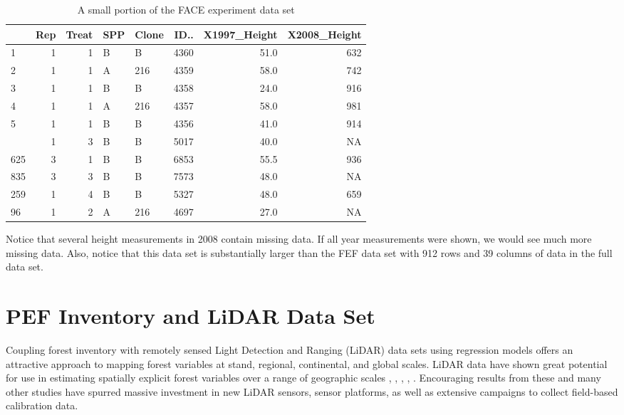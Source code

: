 \documentclass[]{krantz}
\begin{document}
\begin{table}[t]

\caption{\label{tab:face}A small portion of the FACE experiment data set}
\centering
\begin{tabular}{lrrllrrr}
\toprule
  & Rep & Treat & SPP & Clone & ID.. & X1997\_Height & X2008\_Height\\
\midrule
1 & 1 & 1 & B & B & 4360 & 51.0 & 632\\
2 & 1 & 1 & A & 216 & 4359 & 58.0 & 742\\
3 & 1 & 1 & B & B & 4358 & 24.0 & 916\\
4 & 1 & 1 & A & 216 & 4357 & 58.0 & 981\\
5 & 1 & 1 & B & B & 4356 & 41.0 & 914\\
\addlinespace
183 & 1 & 3 & B & B & 5017 & 40.0 & NA\\
625 & 3 & 1 & B & B & 6853 & 55.5 & 936\\
835 & 3 & 3 & B & B & 7573 & 48.0 & NA\\
259 & 1 & 4 & B & B & 5327 & 48.0 & 659\\
96 & 1 & 2 & A & 216 & 4697 & 27.0 & NA\\
\bottomrule
\end{tabular}
\end{table}

Notice that several height measurements in 2008 contain missing data. If all year measurements were shown, we would see much more missing data. Also, notice that this data set is substantially larger than the FEF data set with 912 rows and 39 columns of data in the full data set.

\hypertarget{pef}{%
\section{PEF Inventory and LiDAR Data Set}\label{pef}}

Coupling forest inventory with remotely sensed Light Detection and Ranging (LiDAR) data sets using regression models offers an attractive approach to mapping forest variables at stand, regional, continental, and global scales. LiDAR data have shown great potential for use in estimating spatially explicit forest variables over a range of geographic scales \citep{asner2009}, \citep{babcock2013}, \citep{finley2011}, \citep{naesset2011}, \citep{neigh2013}. Encouraging results from these and many other studies have spurred massive investment in new LiDAR sensors, sensor platforms, as well as extensive campaigns to collect field-based calibration data.
\end{document}

